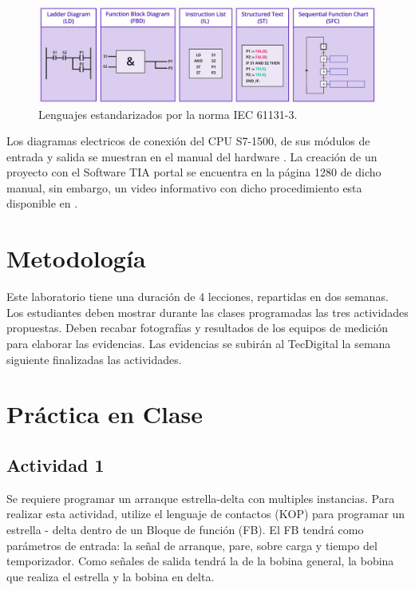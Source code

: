 \begin{figure}
	\centering
	\includegraphics[width=1\linewidth]{fig/Languajes.png}
	\caption{Lenguajes estandarizados por la norma IEC 61131-3.}
	\label{fig:languajes}
\end{figure}


Los diagramas electricos de conexión del CPU S7-1500, de sus módulos de entrada y salida se muestran en el manual del hardware \cite{PLC-1500}. La creación de un proyecto con el Software TIA portal se encuentra en la página  1280 de dicho manual, sin embargo, un video informativo con dicho procedimiento esta disponible en \cite{Maria}. 



 
\section{Metodología}

Este laboratorio tiene una duración de 4 lecciones, repartidas en dos semanas. Los estudiantes deben mostrar durante las clases programadas las tres actividades propuestas. Deben recabar fotografías y resultados de los equipos de medición para elaborar las evidencias. Las evidencias se subirán al TecDigital la semana siguiente finalizadas las actividades.

\section{Práctica en Clase}

\subsection{Actividad 1}

	Se requiere programar un arranque estrella-delta con multiples instancias. Para realizar esta actividad, utilize el lenguaje de contactos (KOP) para programar un  estrella - delta  dentro de un Bloque de función (FB). El FB tendrá como parámetros de entrada: la señal de arranque, pare, sobre carga y tiempo del temporizador. Como señales de salida tendrá la de la bobina general, la bobina que realiza el estrella y la bobina en delta.
	
